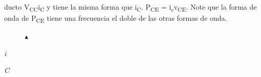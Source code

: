 \documentclass[12pt]{article}
\begin{document}
\begin{adjustwidth}{0.86in}{0.88in}
ducto V\textsubscript{CC}i\textsubscript{C} y tiene la misma forma que i\textsubscript{C}. P\textsubscript{CE} = i\textsubscript{c}v\textsubscript{CE}. Note que la forma de onda de P\textsubscript{CE} tiene una frecuencia el doble de las otras formas de onda.\par

\end{adjustwidth}


\vspace{\baselineskip}

\vspace{\baselineskip}

\vspace{\baselineskip}

\vspace{\baselineskip}
\begin{adjustwidth}{0.0in}{0.01in}
\begin{Center}
{\fontsize{8pt}{9.6pt}\par}
\end{Center}\par

\end{adjustwidth}


\vspace{\baselineskip}

\vspace{\baselineskip}

\vspace{\baselineskip}

\vspace{\baselineskip}

\vspace{\baselineskip}



\begin{figure}[H]
	\begin{Center}
		\includegraphics[width=0.07in,height=0.08in]{./media/image9.png}
	\end{Center}
\end{figure}



\begin{adjustwidth}{2.29in}{0.0in}
{\fontsize{7pt}{8.4pt}\selectfont \textit{i}{\fontsize{5pt}{6.0pt}\selectfont \textit{C\  }\par}\par}\par

\end{adjustwidth}
\end{document}
